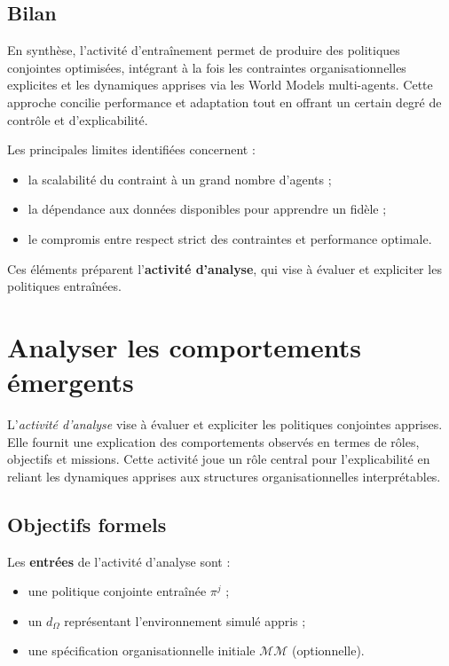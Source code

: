 \section{Bilan}

En synthèse, l'activité d'entraînement permet de produire des politiques conjointes optimisées, intégrant à la fois les contraintes organisationnelles explicites et les dynamiques apprises via les World Models multi-agents.
Cette approche concilie performance et adaptation tout en offrant un certain degré de contrôle et d'explicabilité.

Les principales limites identifiées concernent :
\begin{itemize}
  \item la scalabilité du  contraint à un grand nombre d'agents ;
  \item la dépendance aux données disponibles pour apprendre un  fidèle ;
  \item le compromis entre respect strict des contraintes et performance optimale.
\end{itemize}

Ces éléments préparent l'\textbf{activité d'analyse}, qui vise à évaluer et expliciter les politiques entraînées.


\clearpage
\thispagestyle{empty}
\null
\newpage

\chapter{Analyser les comportements émergents}
\label{chap:analyzing}

L'\textit{activité d'analyse} vise à évaluer et expliciter les politiques conjointes apprises. Elle fournit une explication des comportements observés en termes de rôles, objectifs et missions. Cette activité joue un rôle central pour l'explicabilité en reliant les dynamiques apprises aux structures organisationnelles interprétables.


\section*{Objectifs formels}


Les \textbf{entrées} de l'activité d'analyse sont :
\begin{itemize}
  \item une politique conjointe entraînée $\pi^j$ ;
  \item un  $d_\Omega$ représentant l'environnement simulé appris ;
  \item une spécification organisationnelle initiale $\mathcal{MM}$ (optionnelle).
\end{itemize}

